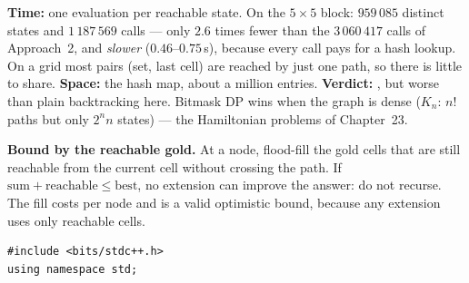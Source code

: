 \begin{alternativebox}
\begin{complexitybox}
\textbf{Time:} one evaluation per reachable state. On the $5 \times 5$ block: $959\,085$ distinct states and $1\,187\,569$ calls --- only $2.6$ times fewer than the $3\,060\,417$ calls of Approach~2, and \emph{slower} ($0.46$--$0.75$\,s), because every call pays for a hash lookup. On a grid most pairs (set, last cell) are reached by just one path, so there is little to share. \textbf{Space:} the hash map, about a million entries. \textbf{Verdict:} \ac{}, but worse than plain backtracking here. Bitmask DP wins when the graph is dense ($K_n$: $n!$ paths but only $2^n n$ states) --- the Hamiltonian problems of Chapter~23.
\end{complexitybox}
\end{alternativebox}

\begin{tricksbox}
\textbf{Bound by the reachable gold.} At a node, flood-fill the gold cells that are still reachable from the current cell without crossing the path. If $\text{sum} + \text{reachable} \le \text{best}$, no extension can improve the answer: do not recurse. The fill costs  per node and is a valid optimistic bound, because any extension uses only reachable cells.

\begin{lstlisting}[style=cpp]
#include <bits/stdc++.h>
using namespace std;


\end{lstlisting}
\end{tricksbox}
